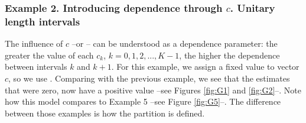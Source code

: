 \documentclass[letterpaper]{article}
\begin{document}
\subsubsection{Example 2. Introducing dependence through $c$. Unitary length intervals}

The influence of $c$ --or -- can be understood as a dependence parameter: the greater the value of each $c_k$, $k=0,1,2,...,K-1$, the higher the dependence between intervals $k$ and $k+1$. For this example, we assign a fixed value to vector $c$, so we use . Comparing with the previous example, we see that the estimates that were zero, now have a positive value --see Figures \ref{fig:G1} and \ref{fig:G2}--. Note  how this model compares to Example 5 --see Figure \ref{fig:G5}--. The difference between those examples is how the partition is defined.
\end{document}
